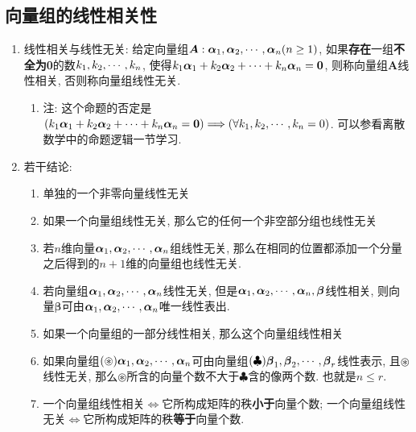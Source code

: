 \subsection{向量组的线性相关性}
\begin{enumerate}
\item 线性相关与线性无关: 给定向量组$\boldsymbol{A}:\boldsymbol{\alpha}_{1},\boldsymbol{\alpha}_{2},\cdots,\boldsymbol{\alpha}_{n}(n\geq1)$,
如果\textbf{存在}一组\textbf{不全为0}的数$k_{1},k_{2},\cdots,k_{n}$, 使得$k_{1}\boldsymbol{\alpha}_{1}+k_{2}\boldsymbol{\alpha}_{2}+\cdots+k_{n}\boldsymbol{\alpha}_{n}=\boldsymbol{0}$,
则称向量组$\boldsymbol{A}$线性相关, 否则称向量组线性无关. 
\begin{enumerate}
\item 注: 这个命题的否定是$(k_{1}\boldsymbol{\alpha}_{1}+k_{2}\boldsymbol{\alpha}_{2}+\cdots+k_{n}\boldsymbol{\alpha}_{n}=\boldsymbol{0})\Longrightarrow(\forall k_{1},k_{2},\cdots,k_{n}=0)$.
可以参看离散数学中的命题逻辑一节学习. 
\end{enumerate}
\item 若干结论: 
\begin{enumerate}
\item 单独的一个非零向量线性无关
\item 如果一个向量组线性无关, 那么它的任何一个非空部分组也线性无关
\item 若$n$维向量$\boldsymbol{\alpha}_{1},\boldsymbol{\alpha}_{2},\cdots,\boldsymbol{\alpha}_{n}$组线性无关, 那么在相同的位置都添加一个分量之后得到的$n+1$维的向量组也线性无关. 
\item 若向量组$\boldsymbol{\alpha}_{1},\boldsymbol{\alpha}_{2},\cdots,\boldsymbol{\alpha}_{n}$线性无关, 但是$\boldsymbol{\alpha}_{1},\boldsymbol{\alpha}_{2},\cdots,\boldsymbol{\alpha}_{n},\boldsymbol{\beta}$线性相关,
则向量$\boldsymbol{\beta}$可由$\boldsymbol{\alpha}_{1},\boldsymbol{\alpha}_{2},\cdots,\boldsymbol{\alpha}_{n}$唯一线性表出. 
\item 如果一个向量组的一部分线性相关, 那么这个向量组线性相关
\item 如果向量组$(\circledast)\boldsymbol{\alpha}_{1},\boldsymbol{\alpha}_{2},\cdots,\boldsymbol{\alpha}_{n}$可由向量组$(\clubsuit)\boldsymbol{\beta}_{1},\boldsymbol{\beta}_{2},\cdots,\boldsymbol{\beta}_{r}$线性表示,
且$\circledast$线性无关, 那么$\circledast$所含的向量个数不大于$\clubsuit$含的像两个数.
也就是$n\leq r$. 
\item 一个向量组线性相关$\Leftrightarrow$它所构成矩阵的秩\textbf{小于}向量个数; 一个向量组线性无关$\Leftrightarrow$它所构成矩阵的秩\textbf{等于}向量个数.
\end{enumerate}
\end{enumerate}

